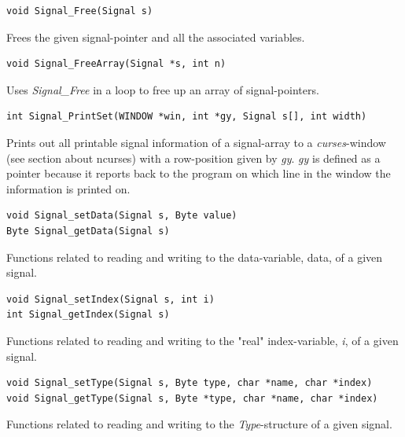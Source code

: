 \documentclass[main.tex]{subfiles}
\begin{document}
\begin{lstlisting}[frame=single] 
void Signal_Free(Signal s)
\end{lstlisting}

Frees the given signal-pointer and all the associated variables.\\

\begin{lstlisting}[frame=single] 
void Signal_FreeArray(Signal *s, int n)
\end{lstlisting}

Uses \textit{Signal\_Free} in a loop to free up an array of signal-pointers.\\

\begin{lstlisting}[frame=single] 
int Signal_PrintSet(WINDOW *win, int *gy, Signal s[], int width)
\end{lstlisting}

Prints out all printable signal information of a signal-array to a \textit{curses}-window (see section about ncurses) with a row-position given by \textit{gy}. \textit{gy} is defined as a pointer because it reports back to the program on which line in the window the information is printed on. \\

\begin{lstlisting}[frame=single] 
void Signal_setData(Signal s, Byte value)
Byte Signal_getData(Signal s)
\end{lstlisting}

Functions related to reading and writing to the data-variable, data, of a given signal.\\

\begin{lstlisting}[frame=single] 
void Signal_setIndex(Signal s, int i)
int Signal_getIndex(Signal s)
\end{lstlisting}

Functions related to reading and writing to the "real" index-variable, \textit{i}, of a given signal.\\

\begin{lstlisting}[frame=single] 
void Signal_setType(Signal s, Byte type, char *name, char *index)
void Signal_getType(Signal s, Byte *type, char *name, char *index)
\end{lstlisting}

Functions related to reading and writing to the \textit{Type}-structure of a given signal.\\
\end{document}
